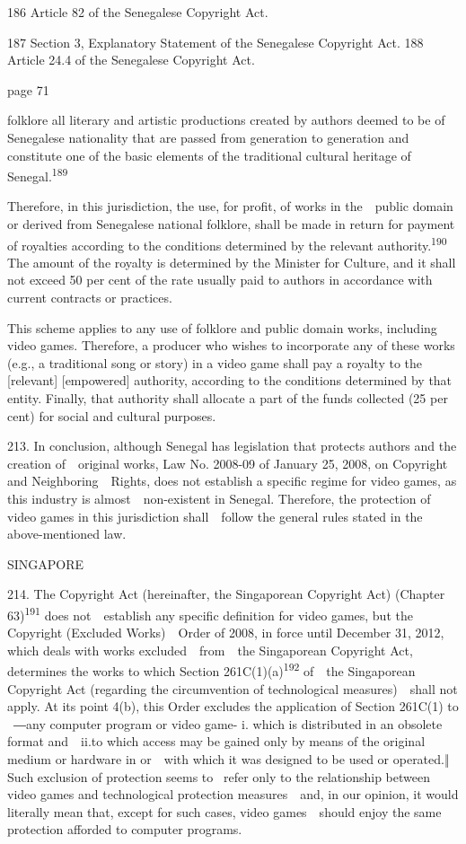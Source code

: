 \documentclass[
]{article}
\begin{document}
{186 }{Article 82 of the Senegalese }{Copyright Act}{.}

{187 }{Section 3, Explanatory Statement of the Senegalese }{Copyright
Act}{. }{188 }{Article 24.4 of the Senegalese }{Copyright Act}{.}

{page 71}

{folklore all literary and artistic productions created by authors
deemed to be of Senegalese nationality that are passed from generation
to generation and constitute one of the basic elements of the
traditional cultural heritage of Senegal.}\textsuperscript{{189}}

{Therefore, in this jurisdiction, the use, for profit, of works in
the~~public domain or derived from Senegalese national folklore, shall
be made in return for payment of royalties according to the conditions
determined by the relevant authority.}\textsuperscript{{190 }}{The
amount of the royalty is determined by the Minister for Culture, and it
shall not exceed 50 per cent of the rate usually paid to authors in
accordance with current contracts or practices.}

{This scheme applies to any use of folklore and public domain works,
including video games. Therefore, a producer who wishes to incorporate
any of these works (e.g., a traditional song or story) in a video game
shall pay a royalty to the {[}relevant{]} {[}empowered{]} authority,
according to the conditions determined by that entity. Finally, that
authority shall allocate a part of the funds collected (25 per cent) for
social and cultural purposes.}

{213. }{In conclusion, although Senegal has legislation that protects
authors and the creation of~~original works, Law No. 2008-09 of January
25, 2008, on }{Copyright and Neighboring~~Rights}{, does not establish a
specific regime for video games, as this industry is
almost~~non-existent in Senegal. Therefore, the protection of video
games in this jurisdiction shall~~follow the general rules stated in the
above-mentioned law.}

{SINGAPORE}

{214. }{The }{Copyright Act }{(hereinafter, the Singaporean }{Copyright
Act}{) (Chapter 63)}\textsuperscript{{191 }}{does not~~establish any
specific definition for video games, but the }{Copyright (Excluded
Works)~~Order }{of 2008, in force until December 31, 2012, which deals
with works excluded~~from~~the Singaporean }{Copyright Act}{, determines
the works to which Section 261C(1)(a)}\textsuperscript{{192 }}{of~~the
Singaporean }{Copyright Act }{(regarding the circumvention of
technological measures)~~shall not apply. At its point 4(b), this Order
excludes the application of Section 261C(1) to }{~―}{any computer
program or video game- i. which is distributed in an obsolete format
and~~ii.to which access may be gained only by means of the original
medium or hardware in or~~with which it was designed to be used or
operated.}{‖ Such exclusion of protection seems to }{~refer only to the
relationship between video games and technological protection
measures~~and, in our opinion, it would literally mean that, except for
such cases, video games~~should enjoy the same protection afforded to
computer programs.}
\end{document}
